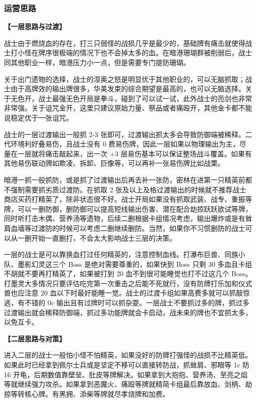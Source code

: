 \documentclass[12pt, a4paper]{article}
\begin{document}
\subsubsection{运营思路}

\textbf{【一层思路与过渡】}

战士由于燃烧血的存在，打三只弱怪的战损几乎是最少的，基础牌有痛击就使得战士打小怪在牌序很极端的情况下也不会掉太多的血。在暗港珊瑚群被削弱后，战士同其他职业一样，暗港压力小一点，但是需要专门提防珊瑚。

关于出门遗物的选择，战士的涅奥之怒是明显优于其他职业的，可以无脑抓取；战士由于高牌效的输出牌很多，华美发束的综合期望是最高的，也可以无脑选择。关于无色开，战士最强无色开局是拳斗，碰到了可以试一试，此外战士的亮剑也非常非常强。关于诅咒金开，这里只建议原始力量、祭品或者痛殴开，其他金卡都不能说稳定优于一张诅咒。

战士的一层过渡输出一般抓 2-3 张即可，过渡输出抓太多会导致防御端被稀释。二代环境利好叠易伤，且战士没有 0 费易伤牌，因此一层如果以物理输出为主，尽量在一层就将痛击敲起来，出一次 +3 层易伤基本可以保证整场战斗覆盖。如果有其他易伤联动牌如欺凌、拆卸、巨像等，可以再补一张易伤牌比如战栗。

暗港一抓一般抓防，或是抓了过渡输出后再去补一张防，密林在进第一只精英前都不强制需要抓劣质过渡防。在抓取 2 张及以上及格过渡输出的时候就不推荐战士商店买药打精英了，除非状态很不好。战士开局如果没有抓取武装、战专、重振等牌，可以一删防御，删防御可以提高短线输出伤害、潜在配合劫掠跃跃欲试等牌，同时听打击木偶、营养汤等遗物，后续二删根据卡组情况考虑，输出爆炸或是有耸肩血墙等过渡防的时候可以考虑二删继续删防。当然，如果你不习惯删防的战士可以从一删开始一直删打，不会太大影响战士三层的决策。

一层的战士是可以靠换血打过任何精英的，注意控制血线。打瀑布巨兽、同族小队、墨影幻灵这三个 Boss 是绝对需要尊重的，如果快到 Boss 只剩 30 多血且卡组不胡就不要再打精英了，如果被打到 20 血不到很可能睡觉也打不过这几个 Boss。打墨灵大多情况只要评估吃完第一次重击之后能不死就行，没有防牌打乐加和仪式兽也应注意 20 血以下时最好能睡一觉。战士的过渡卡组如果高费多就可以抓敲惊逃，有不错的 0c 输出且有过牌时可以抓杂耍。一层战士不要抓过多的牌，抓过多过渡输出就会稀释防御端，抓过多功能牌就会卡启动，战未来的牌也不宜抓太多，以免互卡。

\textbf{【二层思路与对策】}

进入二层的战士一般怕小怪不怕精英，如果没好的防牌打强怪的战损不比精英低。如果此时已经拿到佩尔士兵或是坚定不移可以直接转防战，抓耸肩、邪眼等 1c 防 16 开龟，后期数值靠壁垒、肚皮等牌解决。如果拿到大抱抱、营养汤、至亮之焰等就继续强力攻杀。如果拿到恶魔火、痛殴等牌就精简卡组最后靠放血、剑柄、劫掠等转核心牌。有黑拥、添柴等牌就尽孝烧牌和加费。
\end{document}
